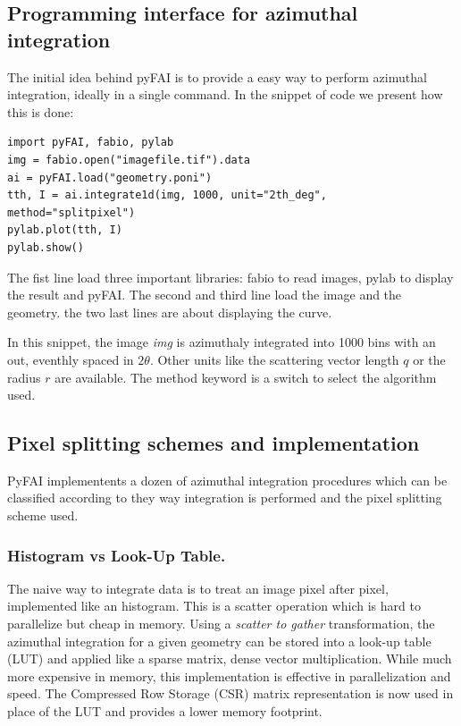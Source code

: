 \documentclass[preprint]{iucr}
\begin{document}
\subsection{Programming interface for azimuthal integration}

The initial idea behind pyFAI is to provide a easy way to perform azimuthal
integration, ideally in a single command. In the snippet of code we present how
this is done:

\begin{verbatim}
import pyFAI, fabio, pylab
img = fabio.open("imagefile.tif").data
ai = pyFAI.load("geometry.poni")
tth, I = ai.integrate1d(img, 1000, unit="2th_deg", method="splitpixel")
pylab.plot(tth, I)
pylab.show()
\end{verbatim}

The fist line load three important libraries: fabio \cite{fabio} to read
images, pylab \cite{matplotlib} to display the result and pyFAI.
The second and third line load the image and the geometry.
the two last lines are about displaying the curve.

In this snippet, the image \textit{img} is azimuthaly integrated into 1000 bins with an
out, eventhly spaced in $2\theta$. Other units like the scattering vector length
$q$ or the radius $r$ are available.
The method keyword is a switch to select the algorithm used.

\subsection{Pixel splitting schemes and implementation}

PyFAI implementents a dozen of azimuthal integration procedures which can be
classified according to they way integration is performed and the pixel
splitting scheme used.

\subsubsection{Histogram vs Look-Up Table.}
The naive way to integrate data is to treat an image pixel after pixel,
implemented like an histogram. This is a scatter operation which is hard to
parallelize but cheap in memory.
Using a \textit{scatter to gather} transformation, the azimuthal integration for
a given geometry can be stored into a look-up table (LUT) and applied like a
sparse matrix, dense vector multiplication.
While much more expensive in memory, this
implementation is effective in parallelization and speed.
The Compressed Row Storage (CSR) matrix representation is now used in place of
the LUT and provides a lower memory footprint.
\end{document}
